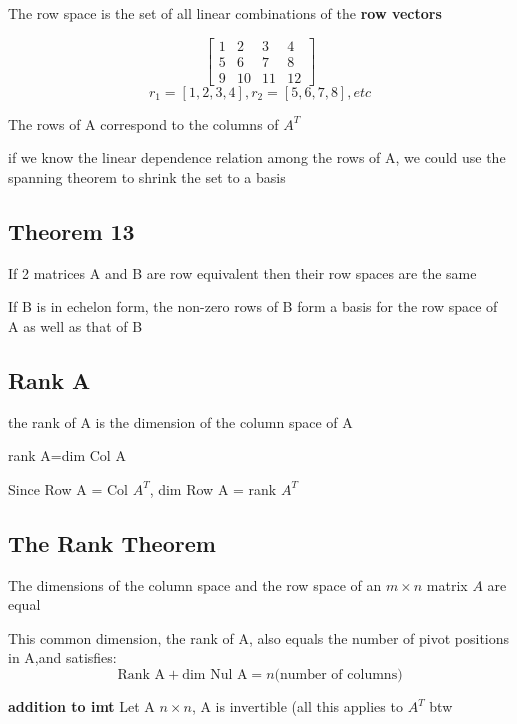 The row space is the set of all linear combinations of the \textbf{row vectors}


\begin{equation}	
	\begin{bmatrix}
		1&2&3&4\\5&6&7&8\\9&10&11&12
	\end{bmatrix}
\end{equation}
\begin{equation}
	\label{}
	r_{1}=[1,2,3,4],r_{2}=[5,6,7,8], etc	
\end{equation}

 

The rows of A correspond to the columns of $A^{T}$

if we know the linear dependence relation among the rows of A, we could use the spanning theorem to shrink the set to a basis
\subsection{Theorem 13}
If 2 matrices A and B are row equivalent then their row spaces are the same

If B is in echelon form, the non-zero rows of B form a basis for the row space of A as well as that of B

\subsection{Rank A}
the rank of A is the dimension of the column space of A


rank A=dim Col A


Since Row A = Col $A^{T}$, dim Row A = rank $A^{T}$

\subsection{The Rank Theorem}
The dimensions of the column space and the row space of an $m \times n$ matrix $A$ are equal

This common dimension, the rank of A, also equals the number of pivot positions in A,and satisfies:
\begin{equation}
	\label{}
	\mbox{Rank A} + \mbox{dim Nul A} = n\mbox{(number of columns)}
\end{equation}

\textbf{addition to imt}
Let A $n\times n$, A is invertible (all this applies to $A^{T}$ btw

\hfill

